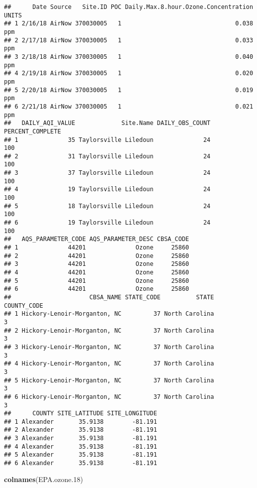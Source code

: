 \documentclass[]{article}
\newenvironment{Shaded}{\begin{snugshade}}{\end{snugshade}}
\newcommand{\KeywordTok}[1]{\textcolor[rgb]{0.13,0.29,0.53}{\textbf{#1}}}
\newcommand{\DecValTok}[1]{\textcolor[rgb]{0.00,0.00,0.81}{#1}}
\newcommand{\NormalTok}[1]{#1}
\begin{document}
\begin{verbatim}
##      Date Source   Site.ID POC Daily.Max.8.hour.Ozone.Concentration UNITS
## 1 2/16/18 AirNow 370030005   1                                0.038   ppm
## 2 2/17/18 AirNow 370030005   1                                0.033   ppm
## 3 2/18/18 AirNow 370030005   1                                0.040   ppm
## 4 2/19/18 AirNow 370030005   1                                0.020   ppm
## 5 2/20/18 AirNow 370030005   1                                0.019   ppm
## 6 2/21/18 AirNow 370030005   1                                0.021   ppm
##   DAILY_AQI_VALUE             Site.Name DAILY_OBS_COUNT PERCENT_COMPLETE
## 1              35 Taylorsville Liledoun              24              100
## 2              31 Taylorsville Liledoun              24              100
## 3              37 Taylorsville Liledoun              24              100
## 4              19 Taylorsville Liledoun              24              100
## 5              18 Taylorsville Liledoun              24              100
## 6              19 Taylorsville Liledoun              24              100
##   AQS_PARAMETER_CODE AQS_PARAMETER_DESC CBSA_CODE
## 1              44201              Ozone     25860
## 2              44201              Ozone     25860
## 3              44201              Ozone     25860
## 4              44201              Ozone     25860
## 5              44201              Ozone     25860
## 6              44201              Ozone     25860
##                      CBSA_NAME STATE_CODE          STATE COUNTY_CODE
## 1 Hickory-Lenoir-Morganton, NC         37 North Carolina           3
## 2 Hickory-Lenoir-Morganton, NC         37 North Carolina           3
## 3 Hickory-Lenoir-Morganton, NC         37 North Carolina           3
## 4 Hickory-Lenoir-Morganton, NC         37 North Carolina           3
## 5 Hickory-Lenoir-Morganton, NC         37 North Carolina           3
## 6 Hickory-Lenoir-Morganton, NC         37 North Carolina           3
##      COUNTY SITE_LATITUDE SITE_LONGITUDE
## 1 Alexander       35.9138        -81.191
## 2 Alexander       35.9138        -81.191
## 3 Alexander       35.9138        -81.191
## 4 Alexander       35.9138        -81.191
## 5 Alexander       35.9138        -81.191
## 6 Alexander       35.9138        -81.191
\end{verbatim}

\begin{Shaded}
\begin{Highlighting}[]
\KeywordTok{colnames}\NormalTok{(EPA.ozone.}\DecValTok{18}\NormalTok{)}
\end{Highlighting}
\end{Shaded}
\end{document}
